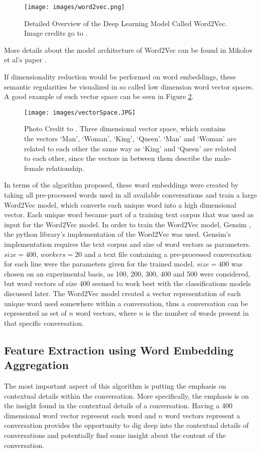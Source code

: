 \documentclass[11pt]{article}
\begin{document}
\begin{figure}[h!]
    \centering
    \texttt{[image: images/word2vec.png]}
    \caption{Detailed Overview of the Deep Learning Model Called Word2Vec. Image credits go to \cite{Kevin2015}.}
    \label{fig:word2vec}
\end{figure}

More details about the model architecture of Word2Vec can be found in Mikolov et al's paper \cite{mikolov2013efficient}.

If dimensionality reduction would be performed on word embeddings, these semantic regularities be visualized in so called low dimension word vector spaces. A good example of such vector space can be seen in Figure \ref{fig:vectorSpace}.

\begin{figure}[h!]
    \centering
    \texttt{[image: images/vectorSpace.JPG]}
    \caption{Photo Credit to \cite{Vidhya}. Three dimensional vector space, which contains the vectors `Man', `Woman', `King', `Queen'. `Man' and `Woman' are related to each other the same way as `King' and `Queen' are related to each other, since the vectors in between them describe the male-female relationship.}
    \label{fig:vectorSpace}
\end{figure}

In terms of the algorithm proposed, these word embeddings were created by taking all pre-processed words used in all available conversations and train a large Word2Vec model, which converts each unique word into a high dimensional vector. Each unique word became part of a training text corpus that was used as input for the Word2Vec model. In order to train the Word2Vec model, Gensim \cite{rehurek_lrec}, the python library's implementation of the Word2Vec was used. Gensim's implementation requires the text corpus and size of word vectors as parameters. $size = 400$, $workers=20$ and a text file containing a pre-processed conversation for each line were the parameters given for the trained model. $size = 400$ was chosen on an experimental basis, as 100, 200, 300, 400 and 500 were considered, but word vectors of size 400 seemed to work best with the classifications models discussed later. The Word2Vec model created a vector representation of each unique word used somewhere within a conversation, thus a conversation can be represented as set of $n$ word vectors, where $n$ is the number of words present in that specific conversation. 

\subsection{Feature Extraction using Word Embedding Aggregation}
The most important aspect of this algorithm is putting the emphasis on contextual details within the conversation. More specifically, the emphasis is on the insight found in the contextual details of a conversation. Having a 400 dimensional word vector represent each word and $n$ word vectors represent a conversation provides the opportunity to dig deep into the contextual details of conversations and potentially find some insight about the content of the conversation. 
\end{document}

